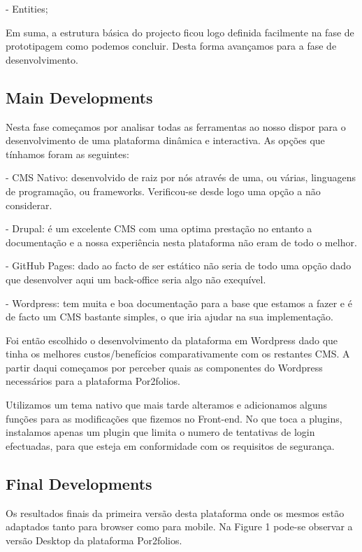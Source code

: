 \documentclass[a4paper,12pt,journal,twoside,compsoc]{PPIEEEtran}
\begin{document}
- Entities;

Em suma, a estrutura básica do projecto ficou logo definida facilmente na fase de prototipagem como podemos concluir. Desta forma avançamos para a fase de desenvolvimento.

\subsection{Main Developments}

Nesta fase começamos por analisar todas as ferramentas ao nosso dispor para o desenvolvimento de uma plataforma dinâmica e interactiva. As opções que tínhamos foram as seguintes:

- \ac{CMS} Nativo: desenvolvido de raiz por nós através de uma, ou várias, linguagens de programação, ou frameworks. Verificou-se desde logo uma opção a não considerar.

- Drupal: é um excelente CMS com uma optima prestação no entanto a documentação e a nossa experiência nesta plataforma não eram de todo o melhor.

- GitHub Pages: dado ao facto de ser estático não seria de todo uma opção dado que desenvolver aqui um back-office seria algo não exequível.

- Wordpress: tem muita e boa documentação para a base que estamos a fazer e é de facto um CMS bastante simples, o que iria ajudar na sua implementação.

Foi então escolhido o desenvolvimento da plataforma em Wordpress dado que tinha os melhores custos/benefícios comparativamente com os restantes CMS. A partir daqui começamos por perceber quais as componentes do Wordpress necessários para a plataforma Por2folios.

Utilizamos um tema nativo que mais tarde alteramos e adicionamos alguns funções para as modificações que fizemos no Front-end. No que toca a plugins, instalamos apenas um plugin que limita o numero de tentativas de login efectuadas, para que esteja em conformidade com os requisitos de segurança.

\clearpage

\subsection{Final Developments}

Os resultados finais da primeira versão desta plataforma onde os mesmos estão adaptados tanto para browser como para mobile. Na Figure 1 pode-se observar a versão Desktop da plataforma Por2folios.
\end{document}
